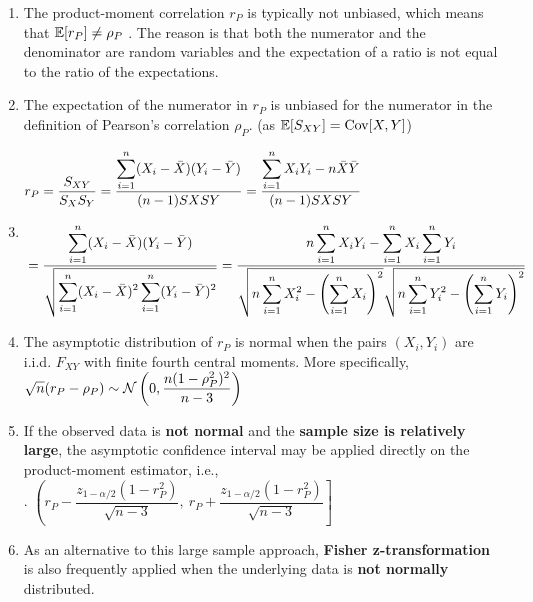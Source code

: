 \begin{enumerate}
    \item The product-moment correlation $r_P$ is typically not unbiased, which means that $\mathbb{E}[r_P] \neq \rho_P$ . 
    The reason is that both the numerator and the denominator are random variables and the expectation of a ratio is not equal to the ratio of the expectations.
    \hfill \cite{statistics/book/Statistics-for-Data-Scientists/Maurits-Kaptein}

    \item The expectation of the numerator in $r_P$ is unbiased for the numerator in the definition of Pearson’s correlation $\rho_P$. (as $\mathbb{E}[S_{X Y}] = \text{Cov}[X, Y]$)
    \hfill \cite{statistics/book/Statistics-for-Data-Scientists/Maurits-Kaptein}

    \item 
    $
        \begin{aligned}
            &r_P 
            = \dfrac{S_{X Y} }{S_X S_Y}
            = \dfrac{\displaystyle\sum^n_{i=1} (X_i - \bar{X} )(Y_i - \bar{Y} )}{(n - 1)S X SY}
            = \dfrac{\displaystyle\sum^n_{i=1} X_i Y_i - n \bar{X} \bar{Y}}{(n - 1)S X SY} \\[0.3cm]
            &= \dfrac{\displaystyle\sum^n_{i=1} (X_i - \bar{X})(Y_i - \bar{Y} )}{\sqrt{\displaystyle\sum^n_{i=1} (X_i - \bar{X} )^2 \displaystyle\sum^n_{i=1} (Y_i - \bar{Y} )^2}}
            = \dfrac{n \displaystyle\sum^n_{i=1} X_i Y_i - \displaystyle\sum^n_{i=1} X_i \displaystyle\sum^n_{i=1} Y_i}{\sqrt{n \displaystyle\sum^n_{i=1} X^2_i - \left(\displaystyle\sum^n_{i=1} X_i\right)^2} \sqrt{n \displaystyle\sum^n_{i=1} Y^2_i - \left(\displaystyle\sum^n_{i=1} Y_i\right)^2}}
        \end{aligned}
    $
    \hfill \cite{statistics/book/Statistics-for-Data-Scientists/Maurits-Kaptein}

    \item The asymptotic distribution of $r_P$ is normal when the pairs $(X_i , Y_i )$ are i.i.d. $F_{ X Y}$ with finite fourth central moments. 
    More specifically, $\sqrt{n}(r_P - \rho_P ) \sim \mathcal{N}\left(0, \dfrac{n(1 - \rho^2_P )^2}{n - 3}\right) $
    \hfill \cite{statistics/book/Statistics-for-Data-Scientists/Maurits-Kaptein}

    \item If the observed data is \textbf{not normal} and the \textbf{sample size is relatively large}, the asymptotic confidence interval may be applied directly on the product-moment estimator, i.e.,
    \hfill \cite{statistics/book/Statistics-for-Data-Scientists/Maurits-Kaptein}
    \\[0.3cm]
    .\hfill
    $
        \left(
            r_P - \dfrac{z_{1-\alpha/2}(1 - r^2_P )}{\sqrt{n-3}},
            \ r_P + \dfrac{z_{1-\alpha/2}(1 - r^2_P )}{\sqrt{n-3}}
        \right]
    $
    \hfill \cite{statistics/book/Statistics-for-Data-Scientists/Maurits-Kaptein}

    \item As an alternative to this large sample approach, \textbf{Fisher z-transformation} is also frequently applied when the underlying data is \textbf{not normally} distributed.
    \hfill \cite{statistics/book/Statistics-for-Data-Scientists/Maurits-Kaptein}
\end{enumerate}






